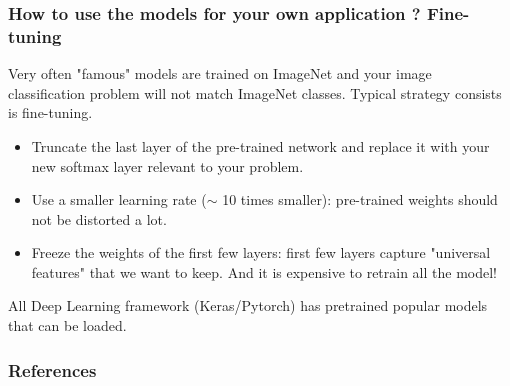 \documentclass[french,9pt]{beamer}
\begin{document}
\begin{frame}
\frametitle{How to use the models for your own application ? Fine-tuning}

Very often "famous" models are trained on ImageNet and your image classification problem will not match ImageNet classes. Typical strategy consists is fine-tuning.

\pause 

\begin{itemize}
\item Truncate the last layer of the pre-trained network and replace it with your new softmax layer relevant to your problem.
\item Use a smaller learning rate ($\sim$ 10 times smaller): pre-trained weights should not be distorted a lot.
\item Freeze the weights of the first few layers: first few layers capture "universal features" that we want to keep. And it is expensive to retrain all the model!
\end{itemize}

\pause

All Deep Learning framework (Keras/Pytorch) has pretrained popular models that can be loaded.


\end{frame}



\begin{frame}[allowframebreaks]
        \frametitle{References}
        
        
\end{frame}
\end{document}
